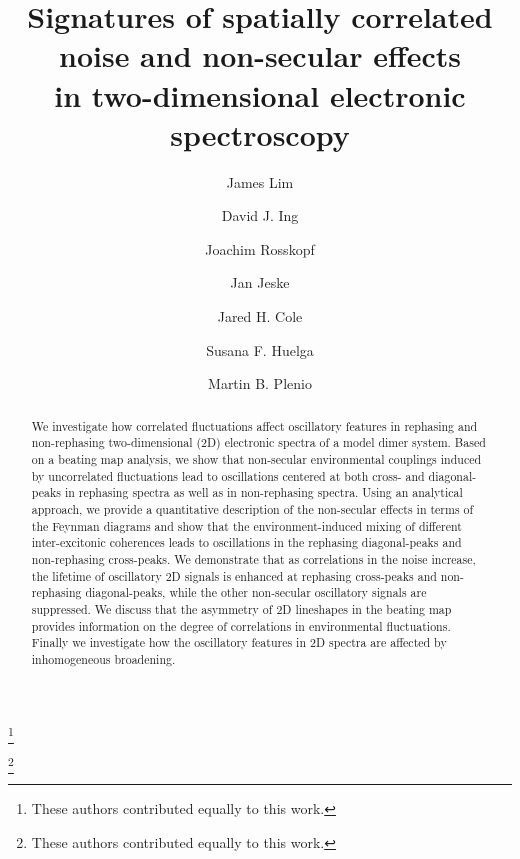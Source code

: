 \documentclass[%
 reprint,%
 amssymb, amsmath,%
 aip,cha,%
]{revtex4-1}
\begin{document}
\title{Signatures of spatially correlated noise and non-secular effects\\in two-dimensional electronic spectroscopy}%

\author{James Lim}\thanks{These authors contributed equally to this work.}%
%

\author{David J. Ing}\thanks{These authors contributed equally to this work.}%
%

\author{Joachim Rosskopf}%
%

\author{Jan Jeske}%
%

\author{Jared H. Cole}%
%

\author{Susana F. Huelga}%
%

\author{Martin B. Plenio}%
%

\begin{abstract}
We investigate how correlated fluctuations affect oscillatory features in rephasing and non-rephasing two-dimensional (2D) electronic spectra of a model dimer system. Based on a beating map analysis, we show that non-secular environmental couplings induced by uncorrelated fluctuations lead to oscillations centered at both cross- and diagonal-peaks in rephasing spectra as well as in non-rephasing spectra. Using an analytical approach, we provide a quantitative description of the non-secular effects in terms of the Feynman diagrams and show that the environment-induced mixing of different inter-excitonic coherences leads to oscillations in the rephasing diagonal-peaks and non-rephasing cross-peaks. We demonstrate that as correlations in the noise increase, the lifetime of oscillatory 2D signals is enhanced at rephasing cross-peaks and non-rephasing diagonal-peaks, while the other non-secular oscillatory signals are suppressed. We discuss that the asymmetry of 2D lineshapes in the beating map provides information on the degree of correlations in environmental fluctuations. Finally we investigate how the oscillatory features in 2D spectra are affected by inhomogeneous broadening.
\end{abstract}
\end{document}
